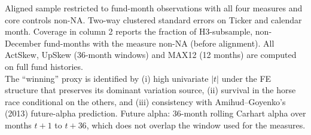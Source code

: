 \begin{table}[!htbp]
\centering
\def\sbetab{%
\tablefont
\setlength{\tabcolsep}{4pt}%
\begin{tabular}{lrrrrrr}
\toprule
Measure & Cov.\ (\%) & $\rho$ vs.\ ActR2 & Univ.\ $t$ (style FE) & Univ.\ $t$ (fund FE) & Horserace $t$ & $\alpha_{t+36}$-pred.\ $t$\\
\midrule
ActR2 & 91.3 & 1.000 & 0.32 & -0.75 & 0.10 & 2.96\\
ActSkew & 98.4 & 0.099 & 5.43 & 2.69 & 4.77 & -1.40\\
MAX12 & 99.7 & -0.069 & 3.01 & 4.05 & 1.27 & -0.04\\
UpSkew & 98.7 & -0.047 & 2.11 & 2.13 & 0.13 & -1.77\\
\bottomrule
\end{tabular}%
}\sbefit
\setlength{\tabletempwidth}{\wd\tabletempbox}
\ifdim\tabletempwidth>\linewidth\setlength{\tabletempwidth}{\linewidth}\fi
\begin{minipage}{\tabletempwidth}
\captionsetup{width=\linewidth}
\caption{Activeness / Lottery Proxy Diagnostic}\label{tab:activeness_proxy}
\ifdim\wd\tabletempbox>\linewidth
  \resizebox{\linewidth}{!}{\usebox{\tabletempbox}}
\else
  \usebox{\tabletempbox}
\fi
\par\medskip
\begin{singlespace}\tablefont\noindent
Aligned sample restricted to fund-month observations with all four measures and core controls non-NA. Two-way clustered standard errors on Ticker and calendar month. Coverage in column 2 reports the fraction of H3-subsample, non-December fund-months with the measure non-NA (before alignment). All ActSkew, UpSkew (36-month windows) and MAX12 (12 months) are computed on full fund histories.\\ The ``winning'' proxy is identified by (i) high univariate $|t|$ under the FE structure that preserves its dominant variation source, (ii) survival in the horse race conditional on the others, and (iii) consistency with Amihud--Goyenko's (2013) future-alpha prediction. Future alpha: 36-month rolling Carhart alpha over months $t+1$ to $t+36$, which does not overlap the window used for the measures.
\end{singlespace}
\end{minipage}
\end{table}

